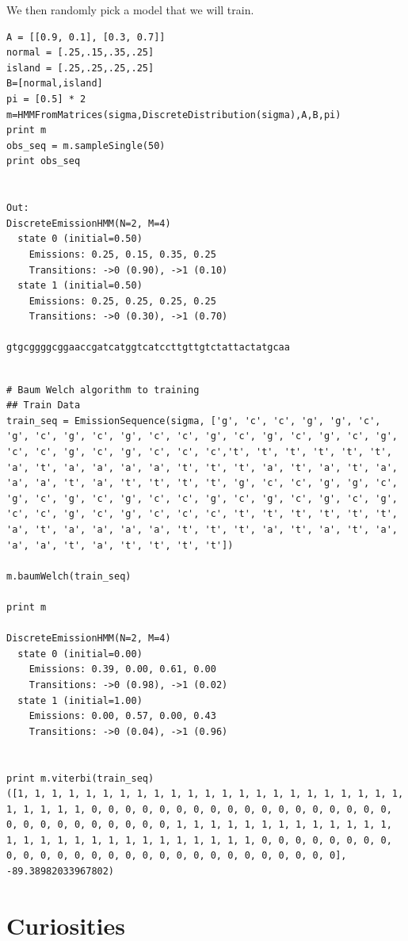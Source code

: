 \documentclass[a4paper,12pt]{article}
\theoremstyle{definition}
\begin{document}
We then randomly pick a model that we will train. 
\begin{lstlisting}
A = [[0.9, 0.1], [0.3, 0.7]]
normal = [.25,.15,.35,.25]
island = [.25,.25,.25,.25]
B=[normal,island]
pi = [0.5] * 2
m=HMMFromMatrices(sigma,DiscreteDistribution(sigma),A,B,pi)
print m
obs_seq = m.sampleSingle(50)
print obs_seq


Out:
DiscreteEmissionHMM(N=2, M=4)
  state 0 (initial=0.50)
    Emissions: 0.25, 0.15, 0.35, 0.25
    Transitions: ->0 (0.90), ->1 (0.10)
  state 1 (initial=0.50)
    Emissions: 0.25, 0.25, 0.25, 0.25
    Transitions: ->0 (0.30), ->1 (0.70)

gtgcggggcggaaccgatcatggtcatccttgttgtctattactatgcaa
\end{lstlisting}

\begin{lstlisting}

# Baum Welch algorithm to training
## Train Data
train_seq = EmissionSequence(sigma, ['g', 'c', 'c', 'g', 'g', 'c', 'g', 'c', 'g', 'c', 'g', 'c', 'c', 'g', 'c', 'g', 'c', 'g', 'c', 'g', 'c', 'c', 'g', 'c', 'g', 'c', 'c', 'c','t', 't', 't', 't', 't', 't', 'a', 't', 'a', 'a', 'a', 'a', 't', 't', 't', 'a', 't', 'a', 't', 'a', 'a', 'a', 't', 'a', 't', 't', 't', 't', 'g', 'c', 'c', 'g', 'g', 'c', 'g', 'c', 'g', 'c', 'g', 'c', 'c', 'g', 'c', 'g', 'c', 'g', 'c', 'g', 'c', 'c', 'g', 'c', 'g', 'c', 'c', 'c', 't', 't', 't', 't', 't', 't', 'a', 't', 'a', 'a', 'a', 'a', 't', 't', 't', 'a', 't', 'a', 't', 'a', 'a', 'a', 't', 'a', 't', 't', 't', 't'])

m.baumWelch(train_seq)

print m

DiscreteEmissionHMM(N=2, M=4)
  state 0 (initial=0.00)
    Emissions: 0.39, 0.00, 0.61, 0.00
    Transitions: ->0 (0.98), ->1 (0.02)
  state 1 (initial=1.00)
    Emissions: 0.00, 0.57, 0.00, 0.43
    Transitions: ->0 (0.04), ->1 (0.96)


print m.viterbi(train_seq)
([1, 1, 1, 1, 1, 1, 1, 1, 1, 1, 1, 1, 1, 1, 1, 1, 1, 1, 1, 1, 1, 1, 1, 1, 1, 1, 1, 1, 0, 0, 0, 0, 0, 0, 0, 0, 0, 0, 0, 0, 0, 0, 0, 0, 0, 0, 0, 0, 0, 0, 0, 0, 0, 0, 0, 0, 1, 1, 1, 1, 1, 1, 1, 1, 1, 1, 1, 1, 1, 1, 1, 1, 1, 1, 1, 1, 1, 1, 1, 1, 1, 1, 1, 1, 0, 0, 0, 0, 0, 0, 0, 0, 0, 0, 0, 0, 0, 0, 0, 0, 0, 0, 0, 0, 0, 0, 0, 0, 0, 0, 0, 0], -89.38982033967802)
\end{lstlisting}


\section{Curiosities}
\end{document}
